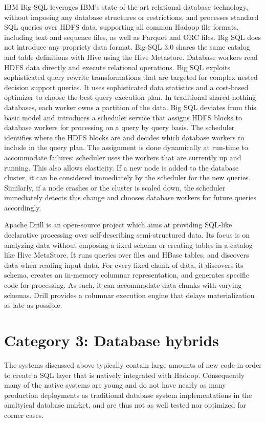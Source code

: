 \documentclass{vldb}
\begin{document}
IBM Big SQL \cite{bigsql} leverages IBM's state-of-the-art relational database technology, without imposing any database structures or restrictions, and processes standard SQL queries over HDFS data, supporting all common Hadoop file formats, including text and sequence files, as well as Parquet and ORC files. Big SQL does not introduce any propriety data format. Big SQL 3.0 shares the same catalog and table definitions with Hive using the Hive Metastore. Database workers read HDFS data directly and execute relational operations. Big SQL exploits sophisticated query rewrite transformations \cite{pirahesh96, winmagic} that are targeted for complex nested decision support queries. It uses sophisticated data statistics and a cost-based optimizer to choose the best query execution plan. In traditional shared-nothing databases, each worker owns a partition of the data. Big SQL deviates from this basic model and introduces a scheduler service that assigns HDFS blocks to database workers for processing on a query by query basis. The scheduler identifies where the HDFS blocks are and decides which database workers to include in the query plan. The assignment is done dynamically at run-time to accommodate failures: scheduler uses the workers that are currently up and running. This also allows elasticity. If a new node is added to the database cluster, it can be considered immediately by the scheduler for the new queries. Similarly, if a node crashes or the cluster is scaled down, the scheduler immediately detects this change and chooses database workers for future queries accordingly.

Apache Drill \cite{drill} is an open-source project which aims at providing SQL-like declarative processing over self-describing semi-structured data. Its focus is on analyzing data without emposing a fixed schema or creating tables in a catalog like Hive MetaStore. It runs queries over files and HBase tables, and discovers data when reading input data. For every fixed chunk of data, it discovers its schema, creates an in-memory columnar representation, and generates specific code for processing. As such, it can accommodate data chunks with varying schemas. Drill provides a columnar execution engine that delays materialization as late as possible.

\section{Category 3: Database hybrids}
The systems discussed above typically contain large amounts of
new code in order to create a SQL layer that is natively integrated
with Hadoop. Consequently many of the native systems are young and do
not have nearly as many production deployments as traditional database system
implementations in the analtyical database market, and are thus not as
well tested nor optimized for corner cases.
\end{document}
